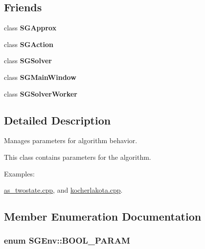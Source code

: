 \subsection*{Friends}
\begin{DoxyCompactItemize}
\item 
\hypertarget{classSGEnv_a80adcf9eac5da53e729646c94d3b8f1d}{class {\bfseries S\-G\-Approx}}\label{classSGEnv_a80adcf9eac5da53e729646c94d3b8f1d}

\item 
\hypertarget{classSGEnv_acb69f3d03d14e95cd7d35ffe622cf58e}{class {\bfseries S\-G\-Action}}\label{classSGEnv_acb69f3d03d14e95cd7d35ffe622cf58e}

\item 
\hypertarget{classSGEnv_a8b0e5d2bebfed7e7e032366bb49bc5f1}{class {\bfseries S\-G\-Solver}}\label{classSGEnv_a8b0e5d2bebfed7e7e032366bb49bc5f1}

\item 
\hypertarget{classSGEnv_a57e09eb109cadcde666335f9e8af571a}{class {\bfseries S\-G\-Main\-Window}}\label{classSGEnv_a57e09eb109cadcde666335f9e8af571a}

\item 
\hypertarget{classSGEnv_a0738b92f2a44c43a342e41240c0f733c}{class {\bfseries S\-G\-Solver\-Worker}}\label{classSGEnv_a0738b92f2a44c43a342e41240c0f733c}

\end{DoxyCompactItemize}


\subsection{Detailed Description}
Manages parameters for algorithm behavior. 

This class contains parameters for the algorithm. \begin{Desc}
\item[Examples\-: ]\par
\hyperlink{as_twostate_8cpp-example}{as\-\_\-twostate.\-cpp}, and \hyperlink{kocherlakota_8cpp-example}{kocherlakota.\-cpp}.\end{Desc}


\subsection{Member Enumeration Documentation}
\hypertarget{classSGEnv_acff56acdb55b7734c7bc63c5ddf6af90}{
\subsubsection[{B\-O\-O\-L\-\_\-\-P\-A\-R\-A\-M}]{\setlength{\rightskip}{0pt plus 5cm}enum {\bf S\-G\-Env\-::\-B\-O\-O\-L\-\_\-\-P\-A\-R\-A\-M}}}\label{classSGEnv_acff56acdb55b7734c7bc63c5ddf6af90}


